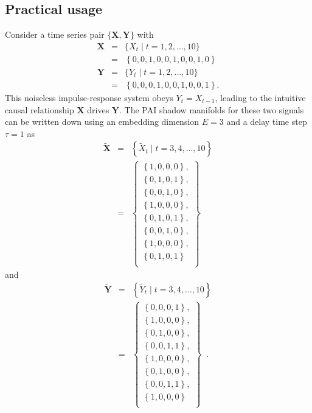 \subsection{Practical usage}
Consider a time series pair $\{\mathbf{X},\mathbf{Y}\}$ with
\begin{eqnarray*}
\mathbf{X} &=& \{X_t\; | \; t=1,2,\ldots,10\}\\
&=& \left\{0,0,1,0,0,1,0,0,1,0\right\}\\
\mathbf{Y} &=& \{Y_t\; | \; t=1,2,\ldots,10\}\\
&=& \left\{0,0,0,1,0,0,1,0,0,1\right\}.
\end{eqnarray*}
This noiseless impulse-response system obeys $Y_t=X_{t-1}$, leading to the intuitive causal relationship $\mathbf{X}$ drives $\mathbf{Y}$.  The PAI shadow manifolds for these two signals can be written down using an embedding dimension $E=3$ and a delay time step $\tau=1$ as
\begin{eqnarray}
\tilde{\mathbf{X}} &=& \left\{\tilde{X}_t\;|\;t=3,4,\ldots,10\right\}\\
&=&\left\{\begin{array}{c} 
\left\{1,0,0,0\right\},\\
\left\{0,1,0,1\right\},\\
\left\{0,0,1,0\right\},\\
\left\{1,0,0,0\right\},\\
\left\{0,1,0,1\right\},\\
\left\{0,0,1,0\right\},\\
\left\{1,0,0,0\right\},\\
\left\{0,1,0,1\right\}\\
\end{array}\right\}
\end{eqnarray}
and
\begin{eqnarray}
\tilde{\mathbf{Y}} &=& \left\{\tilde{Y}_t\;|\;t=3,4,\ldots,10\right\}\\
&=&\left\{\begin{array}{c} 
\left\{0,0,0,1\right\},\\
\left\{1,0,0,0\right\},\\
\left\{0,1,0,0\right\},\\
\left\{0,0,1,1\right\},\\
\left\{1,0,0,0\right\},\\
\left\{0,1,0,0\right\},\\
\left\{0,0,1,1\right\},\\
\left\{1,0,0,0\right\}\\
\end{array}\right\}\;\;.
\end{eqnarray}
